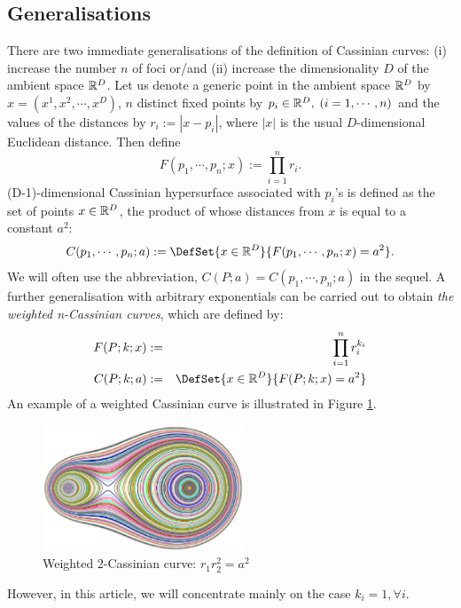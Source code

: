 \documentclass{article}
\begin{document}
\subsection{Generalisations}
\label{sec-1-2}
There are two immediate generalisations of the definition of Cassinian curves: (i) increase the number $n$ of foci or/and (ii) increase the dimensionality $D$ of the ambient space $\mathbb R^{D}$. 
Let us denote a generic point in the ambient space $\mathbb R^{D}$ by $x =(x^1, x^2, \cdots, x^D)$, $n$ distinct fixed points by $p_i \in \mathbb R^D, \; (i=1,\cdots, n)$ 
and the values of the distances by $r_i := |x-p_i|$, where $|x|$ is the usual $D$-dimensional Euclidean distance.
 Then define 
\begin{equation}
\label{}
F(p_1,\cdots,p_n;x):=\prod_{i=1}^{n} r_i.
\end{equation}
(D-1)-dimensional Cassinian hypersurface associated with $p_i$'s is defined as the set of points $x\in \mathbb R^D$, the product of whose distances from $x$ is equal to a constant $a^2$:
\begin{equation}
\label{ }
C(p_1,\cdots,p_n;a) :=\DefSet{x\in \R^D}{F(p_1,\cdots,p_n;x) = a^2 }.
\end{equation}
We will often use the abbreviation, $C(P;a)=C(p_1,\cdots,p_n;a)$ in the sequel. 
A further generalisation with arbitrary exponentials can be carried out to obtain \emph{the weighted n-Cassinian curves}, which are defined by:
\begin{eqnarray}
F(P;k;x) & := & \prod_{i=1}^{n} r_i^{k_i} \nonumber\\
C(P;k;a) &:=&\DefSet{x\in \R^D}{F(P;k;x) = a^2 }
\end{eqnarray}
An example of a weighted Cassinian curve is illustrated in Figure \ref{fig:weighted_2_cass}.
\begin{figure}[h]
\begin{center}
\includegraphics[width=6cm]{images/cassini2_weighted.eps}
\caption{Weighted 2-Cassinian curve: $r_1 r_2^2 = a^2$}
\label{fig:weighted_2_cass}
\end{center}
\end{figure}
However, in this article, we will concentrate mainly on the case $k_i = 1, \forall i$.
\end{document}
